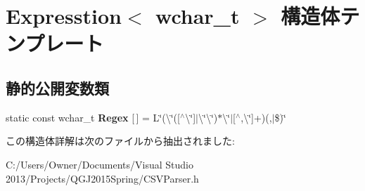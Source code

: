 \hypertarget{struct_expresstion_3_01wchar__t_01_4}{}\section{Expresstion$<$ wchar\+\_\+t $>$ 構造体テンプレート}
\label{struct_expresstion_3_01wchar__t_01_4}
\subsection*{静的公開変数類}
\begin{DoxyCompactItemize}
\item 
static const wchar\+\_\+t {\bfseries Regex} \mbox{[}$\,$\mbox{]} = L\char`\"{}(\textbackslash{}\char`\"{}(\mbox{[}$^\wedge$\textbackslash{}\char`\"{}\mbox{]}$\vert$\textbackslash{}\char`\"{}\textbackslash{}\char`\"{})$\ast$\textbackslash{}\char`\"{}$\vert$\mbox{[}$^\wedge$,\textbackslash{}\char`\"{}\mbox{]}+)(,$\vert$\$)\char`\"{}\hypertarget{struct_expresstion_3_01wchar__t_01_4_af6f52869f4e8b5573484561b32b871b2}{}\label{struct_expresstion_3_01wchar__t_01_4_af6f52869f4e8b5573484561b32b871b2}

\end{DoxyCompactItemize}


この構造体詳解は次のファイルから抽出されました\+:\begin{DoxyCompactItemize}
\item 
C\+:/\+Users/\+Owner/\+Documents/\+Visual Studio 2013/\+Projects/\+Q\+G\+J2015\+Spring/C\+S\+V\+Parser.\+h\end{DoxyCompactItemize}
